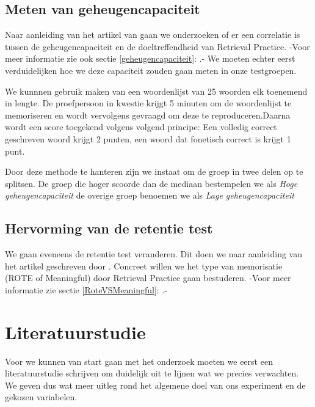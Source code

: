 \documentclass[12pt,a4paper]{article}
\begin{document}
	    \subsection{Meten van geheugencapaciteit}
	    Naar aanleiding van het artikel van \cite{Agarwal2016} gaan we onderzoeken of er een correlatie is tussen de geheugencapaciteit en de doeltreffendheid van Retrieval Practice. -Voor meer informatie zie ook sectie \ref{geheugencapaciteit}: .- We moeten echter eerst verduidelijken hoe we deze capaciteit zouden gaan meten in onze testgroepen.\\
	    \par
	    \noindent
	    We kunnnen gebruik maken van een woordenlijst van 25 woorden elk toenemend in lengte. De proefpersoon in kwestie krijgt 5 minuten om de woordenlijst te memoriseren en wordt vervolgens gevraagd om deze te reproduceren.Daarna wordt een score toegekend volgens volgend principe: Een volledig correct geschreven woord krijgt 2 punten, een woord dat fonetisch correct is krijgt 1 punt.\\
	    \par
	    \noindent
	    Door deze methode te hanteren zijn we instaat om de groep in twee delen op te splitsen. De groep die hoger scoorde dan de mediaan bestempelen we als \textit{Hoge geheugencapaciteit} de overige groep benoemen we als \textit{Lage geheugencapaciteit}
	    
      	\subsection{Hervorming van de retentie test}
      	We gaan eveneens de retentie test veranderen. Dit doen we naar aanleiding van het artikel geschreven door \cite{TamaravanGog2012}. Concreet willen we het type van memorisatie (ROTE of Meaningful) door Retrieval Practice gaan bestuderen. -Voor meer informatie zie sectie \ref{RoteVSMeaningful}: .-\\
      	
      	\par
      	\noindent
      	
    \newpage
    \section{Literatuurstudie}
    
    Voor we kunnen van start gaan met het onderzoek moeten we eerst een literatuurstudie schrijven om duidelijk uit te lijnen wat we precies verwachten. We geven dus wat meer uitleg rond het algemene doel van ons experiment en de gekozen variabelen.
    
\end{document}
